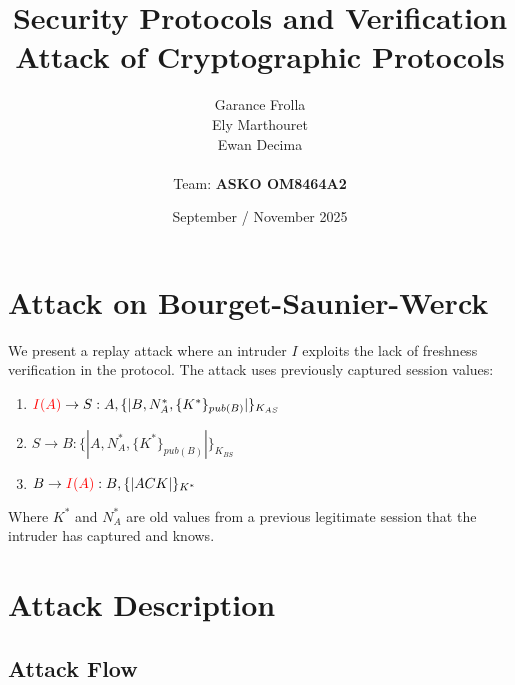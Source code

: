 \documentclass[11pt]{article}
\begin{document}
    \title{
            { \textbf{Security Protocols and Verification}} \\[1ex]
        {\small Attack of Cryptographic Protocols}
    }


    \author{
        Garance Frolla \\
        Ely Marthouret \\
        Ewan Decima\\ \\
        Team: \textbf{ASKO OM8464A2}
    }

    \date{September / November 2025}


    \maketitle
    \tableofcontents
    \newpage



    \section{Attack on Bourget-Saunier-Werck}


    We present a replay attack where an intruder $I$ exploits the lack of freshness verification in the protocol. The
    attack uses previously captured session values:

    \begin{enumerate}
        \item $\textcolor{red}{I(A)} \rightarrow S : A, \{| B, N_A^*, \{K^*\}_{pub(B)} |\}_{K_{AS}}$
        \item $S \rightarrow B : \{| A, N_A^*, \{K^*\}_{pub(B)} |\}_{K_{BS}}$
        \item $B \rightarrow \textcolor{red}{I(A)} : B, \{| ACK |\}_{K^*}$
    \end{enumerate}

    Where $K^*$ and $N_A^*$ are old values from a previous legitimate session that the intruder has captured and knows.

    \section{Attack Description}

    \subsection{Attack Flow}
\end{document}
